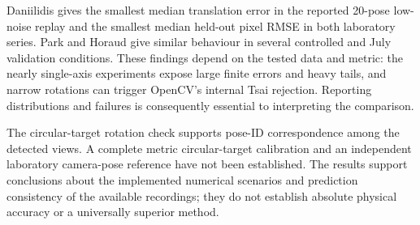 \documentclass[12pt,a4paper]{article}
\begin{document}
Daniilidis gives the smallest median translation error in the reported 20-pose low-noise replay and the smallest median held-out pixel RMSE in both laboratory series. Park and Horaud give similar behaviour in several controlled and July validation conditions. These findings depend on the tested data and metric: the nearly single-axis experiments expose large finite errors and heavy tails, and narrow rotations can trigger OpenCV's internal Tsai rejection. Reporting distributions and failures is consequently essential to interpreting the comparison. \cite{experimentcode,opencvsource}

The circular-target rotation check supports pose-ID correspondence among the detected views. A complete metric circular-target calibration and an independent laboratory camera-pose reference have not been established. The results support conclusions about the implemented numerical scenarios and prediction consistency of the available recordings; they do not establish absolute physical accuracy or a universally superior method. \cite{experimentcode,eauncertainty}

\clearpage
\appendix
\clearpage
\end{document}
